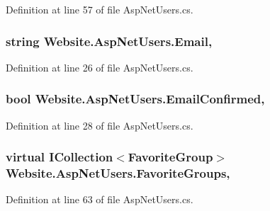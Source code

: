 Definition at line 57 of file Asp\+Net\+Users.\+cs.

\hypertarget{class_website_1_1_asp_net_users_ab15b5817affddc4c49e8e9a9e044f636}{}
\subsubsection[{Email}]{\setlength{\rightskip}{0pt plus 5cm}string Website.\+Asp\+Net\+Users.\+Email\hspace{0.3cm}{\ttfamily [get]}, {\ttfamily [set]}}\label{class_website_1_1_asp_net_users_ab15b5817affddc4c49e8e9a9e044f636}


Definition at line 26 of file Asp\+Net\+Users.\+cs.

\hypertarget{class_website_1_1_asp_net_users_a2d1c56601271423ddfca2bdb0a4da378}{}
\subsubsection[{Email\+Confirmed}]{\setlength{\rightskip}{0pt plus 5cm}bool Website.\+Asp\+Net\+Users.\+Email\+Confirmed\hspace{0.3cm}{\ttfamily [get]}, {\ttfamily [set]}}\label{class_website_1_1_asp_net_users_a2d1c56601271423ddfca2bdb0a4da378}


Definition at line 28 of file Asp\+Net\+Users.\+cs.

\hypertarget{class_website_1_1_asp_net_users_a5ad2e645c652cf4d75b38db152b13290}{}
\subsubsection[{Favorite\+Groups}]{\setlength{\rightskip}{0pt plus 5cm}virtual I\+Collection$<${\bf Favorite\+Group}$>$ Website.\+Asp\+Net\+Users.\+Favorite\+Groups\hspace{0.3cm}{\ttfamily [get]}, {\ttfamily [set]}}\label{class_website_1_1_asp_net_users_a5ad2e645c652cf4d75b38db152b13290}


Definition at line 63 of file Asp\+Net\+Users.\+cs.

